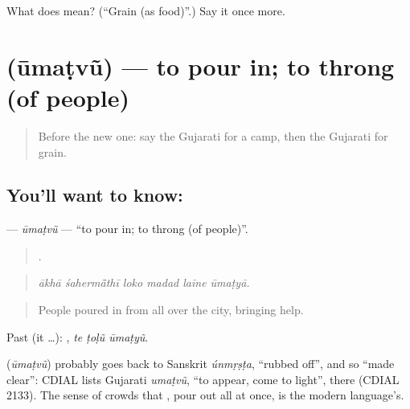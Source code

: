\begin{tcolorbox}[breakable,colback=teal!4,colframe=teal!35!black,title={Before you move on}]
What does  mean? (\textquotedblleft{}Grain (as food)\textquotedblright{}.) Say it once more.
\end{tcolorbox}
\section[\texorpdfstring{\gu{ઊમટવું} (ūmaṭvũ)}{ઊમટવું (ūmaṭvũ)}]{ (ūmaṭvũ) — to pour in; to throng (of people)}

\label{lesson:GU-C306-umatvu}



\begin{quote}
Before the new one: say the Gujarati for a camp, then the Gujarati for grain.
\end{quote}

\subsection*{You'll want to know: }
\textbf{} — \emph{ūmaṭvũ} — \textquotedblleft{}to pour in; to throng (of people)\textquotedblright{}.

\begin{quote}
     .
\end{quote}

\begin{quote}
\emph{ākhā śahermā̃thī loko madad laīne ūmaṭyā.}
\end{quote}

\begin{quote}
People poured in from all over the city, bringing help.
\end{quote}

Past (it …):   , \emph{te ṭoḷũ ūmaṭyũ}.

\begin{cousinweb}
\textbf{} (\emph{ūmaṭvũ}) probably goes back to Sanskrit \emph{únmṛṣṭa}, \textquotedblleft{}rubbed off\textquotedblright{}, and so \textquotedblleft{}made clear\textquotedblright{}: CDIAL lists Gujarati \emph{umaṭvũ}, \textquotedblleft{}to appear, come to light\textquotedblright{}, there (CDIAL 2133). The sense of crowds that \textbf{ }, pour out all at once, is the modern language's.
\end{cousinweb}


